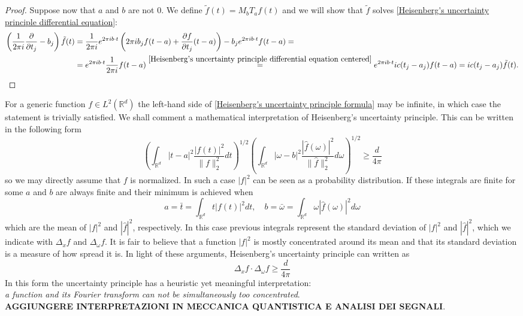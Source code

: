 \documentclass[corpo=11pt, stile=classica, tipotesi=custom,
greek, evenboxes, english]{toptesi}
\numberwithin{equation}{chapter}
\theoremstyle{remark}
\newcommand{\R}{\mathbb{R}} %
\newcommand{\pdfrac}[2]{\dfrac{\partial #1}{\partial #2}}
\begin{document}
\begin{proof}
{	Suppose now that $a$ and $b$ are not 0. We define $\tilde{f}(t) = M_b T_a f(t)$ and we will show that $\tilde{f}$ solves \eqref{Heisenberg's uncertainty principle differential equation}:
	\begin{align*}
		\left(\dfrac{1}{2\pi i}\pdfrac{}{t_j} - b_j\right)\tilde{f}(t) &= \dfrac{1}{2\pi i} e^{2 \pi i b \cdot t} \left(2\pi i b_j f(t-a) + \pdfrac{f}{t_j}(t-a)\right) - b_j e^{2 \pi i b \cdot t}f(t-a) =\\
		&=e^{2 \pi i b \cdot t}\dfrac{1}{2 \pi i}f(t-a) \overset{\eqref{Heisenberg's uncertainty principle differential equation centered}}{=} e^{2 \pi i b \cdot t} i c (t_j-a_j) f(t-a) = i c (t_j-a_j) \tilde{f}(t).
	\end{align*}
	}
\end{proof}
For a generic function $f \in L^2(\R^d)$ the left-hand side of \eqref{Heisenberg's uncertainty principle formula} may be infinite, in which case the statement is trivially satisfied. {\color{blue}We shall comment a mathematical interpretation of Heisenberg's uncertainty principle. This can be written in the following form
\begin{equation*}
	\left(\int_{\R^d}|t-a|^2 \dfrac{|f(t)|^2}{\|f\|_2^2} dt\right)^{1/2} \left(\int_{\R^d} |\omega-b|^2 \dfrac{|\hat{f}(\omega)|^2}{\|\hat{f}\|_2^2}d\omega\right)^{1/2} \geq \dfrac{d}{4\pi}
\end{equation*}
so we may directly assume that $f$ is normalized. In such a case $|f|^2$ can be seen as a probability distribution. If these integrals are finite for some $a$ and $b$ are always finite and their minimum is achieved when
\begin{equation*}
	a = \bar{t} = \int_{\R^d} t |f(t)|^2 dt, \quad b = \bar{\omega} = \int_{\R^d} \omega |\hat{f}(\omega)|^2 d\omega
\end{equation*}
which are the mean of $|f|^2$ and $|\hat{f}|^2$, respectively. In this case previous integrals represent the standard deviation of $|f|^2$ and $|\hat{f}|^2$, which we indicate with $\Delta_x f$ and $\Delta_{\omega} f$. It is fair to believe that a function $|f|^2$ is mostly concentrated around its mean and that its standard deviation is a measure of how spread it is. In light of these arguments, Heisenberg's uncertainty principle can written as
\begin{equation*}
	\Delta_x f \cdot \Delta_{\omega} f \geq \dfrac{d}{4\pi}
\end{equation*}
In this form the uncertainty principle has a heuristic yet meaningful interpretation:\\
\emph{a function and its Fourier transform can not be simultaneously too concentrated}.\\
\textbf{AGGIUNGERE INTERPRETAZIONI IN MECCANICA QUANTISTICA E ANALISI DEI SEGNALI}.}
\end{document}
